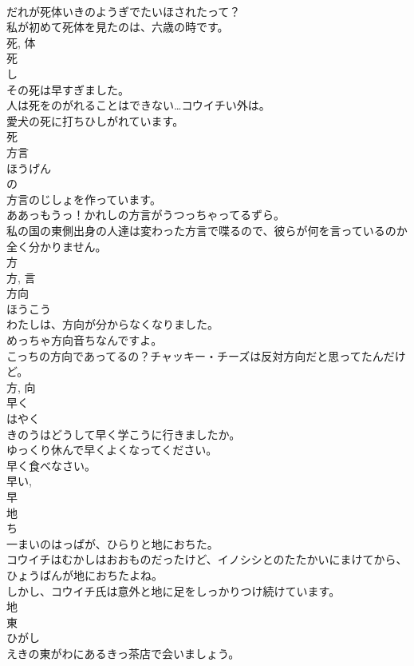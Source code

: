 \documentclass[8pt]{extreport}
\begin{document}
\begin{CJK}{UTF8}{min}
\\	だれが死体いきのようぎでたいほされたって？	
\\	私が初めて死体を見たのは、六歳の時です。	
\\	死, 体	
\\	死	
\\	し	
\\	その死は早すぎました。	
\\	人は死をのがれることはできない…コウイチい外は。	
\\	愛犬の死に打ちひしがれています。	
\\	死	
\\	方言	
\\	ほうげん	
\\	の 
\\	方言のじしょを作っています。	
\\	ああっもうっ！かれしの方言がうつっちゃってるずら。	
\\	私の国の東側出身の人達は変わった方言で喋るので、彼らが何を言っているのか全く分かりません。	
\\	方 
\\	方, 言	
\\	方向	
\\	ほうこう	
\\	わたしは、方向が分からなくなりました。	
\\	めっちゃ方向音ちなんですよ。	
\\	こっちの方向であってるの？チャッキー・チーズは反対方向だと思ってたんだけど。	
\\	方, 向	
\\	早く	
\\	はやく	
\\	きのうはどうして早く学こうに行きましたか。	
\\	ゆっくり休んで早くよくなってください。	
\\	早く食べなさい。	
\\	早い, 
\\	早	
\\	地	
\\	ち	
\\	一まいのはっぱが、ひらりと地におちた。	
\\	コウイチはむかしはおおものだったけど、イノシシとのたたかいにまけてから、ひょうばんが地におちたよね。	
\\	しかし、コウイチ氏は意外と地に足をしっかりつけ続けています。	
\\	地	
\\	東	
\\	ひがし	
\\	えきの東がわにあるきっ茶店で会いましょう。	

\end{CJK}
\end{document}
